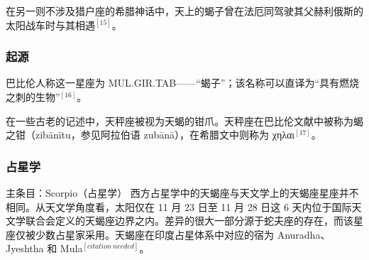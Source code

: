 在另一则不涉及猎户座的希腊神话中，天上的蝎子曾在法厄同驾驶其父赫利俄斯的太阳战车时与其相遇$^{[15]}$。
\subsubsection{起源}  
巴比伦人称这一星座为 MUL.GIR.TAB——“蝎子”；该名称可以直译为“具有燃烧之刺的生物”$^{[16]}$。

在一些古老的记述中，天秤座被视为天蝎的钳爪。天秤座在巴比伦文献中被称为蝎之钳（zibānītu，参见阿拉伯语 zubānā），在希腊文中则称为 χηλαι$^{[17]}$。
\subsubsection{占星学}  
主条目：Scorpio（占星学）  
西方占星学中的天蝎座与天文学上的天蝎座星座并不相同。从天文学角度看，太阳仅在 11 月 23 日至 11 月 28 日这 6 天内位于国际天文学联合会定义的天蝎座边界之内。差异的很大一部分源于蛇夫座的存在，而该星座仅被少数占星家采用。天蝎座在印度占星体系中对应的宿为 Anuradha、Jyeshtha 和 Mula$^{[citation\ needed]}$。
